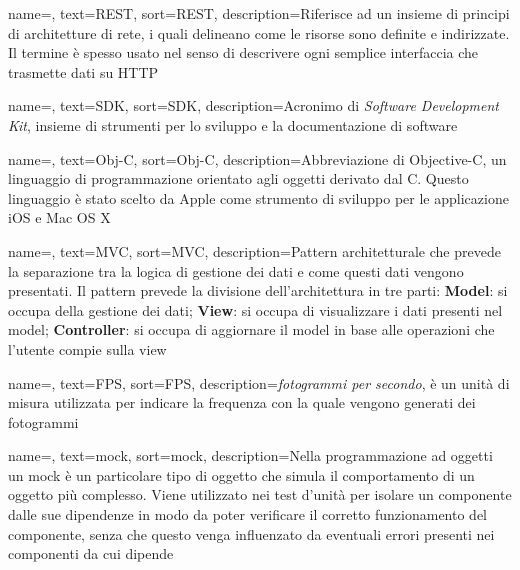 {
    name=,
    text=REST,
    sort=REST,
    description={Riferisce ad un insieme di principi di architetture di rete, i quali delineano come le risorse sono definite e indirizzate. Il termine è spesso usato nel senso di descrivere ogni semplice interfaccia che trasmette dati su HTTP}
}

{
name=,
text=SDK,
sort=SDK,
description={Acronimo di \textit{Software Development Kit}, insieme di strumenti per lo sviluppo e la documentazione di software}
}

{
    name=,
    text=Obj-C,
    sort=Obj-C,
    description={Abbreviazione di Objective-C, un linguaggio di programmazione orientato agli oggetti derivato dal C. Questo linguaggio è stato scelto da Apple come strumento di sviluppo per le applicazione iOS e Mac OS X}
}

{
    name=,
    text=MVC,
    sort=MVC,
    description={Pattern architetturale che prevede la separazione tra la logica di gestione dei dati e come questi dati vengono presentati. Il pattern prevede la divisione dell'architettura in tre parti: \textbf{Model}: si occupa della gestione dei dati; \textbf{View}: si occupa di visualizzare i dati presenti nel model; \textbf{Controller}: si occupa di aggiornare il model in base alle operazioni che l'utente compie sulla view}
}

{
name=,
text=FPS,
sort=FPS,
description={\textit{fotogrammi per secondo}, è un unità di misura utilizzata per indicare la frequenza con la quale vengono generati dei fotogrammi}
}

{
name=,
text=mock,
sort=mock,
description={Nella programmazione ad oggetti un mock è un particolare tipo di oggetto che simula il comportamento di un oggetto più complesso. Viene utilizzato nei test d'unità per isolare un componente dalle sue dipendenze in modo da poter verificare il corretto funzionamento del componente, senza che questo venga influenzato da eventuali errori presenti nei componenti da cui dipende}
}






